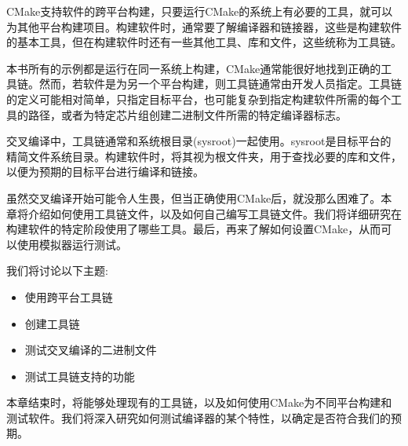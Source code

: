 CMake支持软件的跨平台构建，只要运行CMake的系统上有必要的工具，就可以为其他平台构建项目。构建软件时，通常要了解编译器和链接器，这些是构建软件的基本工具，但在构建软件时还有一些其他工具、库和文件，这些统称为工具链。

本书所有的示例都是运行在同一系统上构建，CMake通常能很好地找到正确的工具链。然而，若软件是为另一个平台构建，则工具链通常由开发人员指定。工具链的定义可能相对简单，只指定目标平台，也可能复杂到指定构建软件所需的每个工具的路径，或者为特定芯片组创建二进制文件所需的特定编译器标志。

交叉编译中，工具链通常和系统根目录(sysroot)一起使用。sysroot是目标平台的精简文件系统目录。构建软件时，将其视为根文件夹，用于查找必要的库和文件，以便为预期的目标平台进行编译和链接。

虽然交叉编译开始可能令人生畏，但当正确使用CMake后，就没那么困难了。本章将介绍如何使用工具链文件，以及如何自己编写工具链文件。我们将详细研究在构建软件的特定阶段使用了哪些工具。最后，再来了解如何设置CMake，从而可以使用模拟器运行测试。

我们将讨论以下主题:

\begin{itemize}
\item 
使用跨平台工具链

\item 
创建工具链

\item 
测试交叉编译的二进制文件

\item 
测试工具链支持的功能
\end{itemize}

本章结束时，将能够处理现有的工具链，以及如何使用CMake为不同平台构建和测试软件。我们将深入研究如何测试编译器的某个特性，以确定是否符合我们的预期。
















